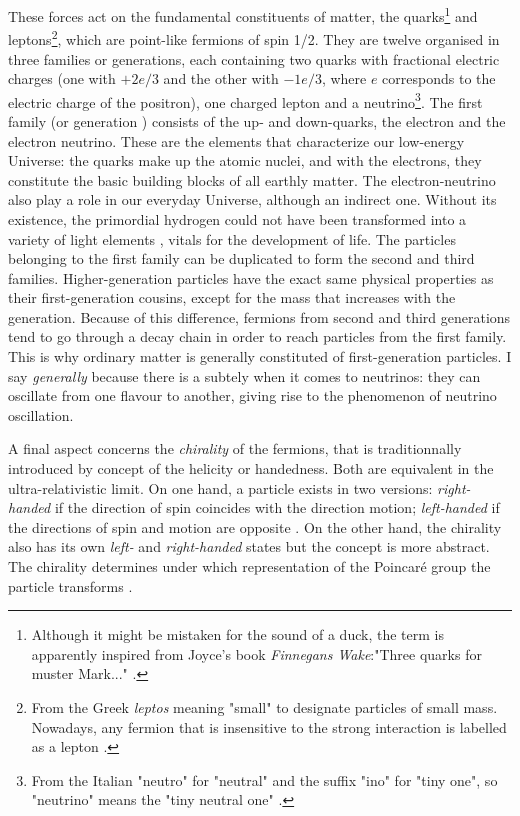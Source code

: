 These forces act on the fundamental constituents of matter, the quarks\footnote{Although it might be mistaken for the sound of a duck, the term is apparently inspired from Joyce's book \textit{Finnegans Wake}:"Three quarks for muster Mark..." \cite{s.glashowInteractionsJourneyMind1990}.} and leptons\footnote{From the Greek \textit{leptos} meaning "small" to designate particles of small mass. Nowadays, any fermion that is insensitive to the strong interaction is labelled as a lepton \cite{s.glashowInteractionsJourneyMind1990}.}, which are point-like fermions of spin 1/2. They are twelve organised in three families or generations, each containing two quarks with fractional electric charges (one with $+2 e /3$ and the other with $-1 e/3$, where $e$ corresponds to the electric charge of the positron), one charged lepton and a neutrino\footnote{From the Italian "neutro" for "neutral" and the suffix "ino" for "tiny one",  so "neutrino" means the "tiny neutral one" \cite{s.glashowInteractionsJourneyMind1990}.}. The first family (or generation ) consists of the up- and down-quarks, the electron and the electron neutrino. These are the elements that characterize our low-energy Universe: the quarks make up the atomic nuclei, and with the electrons, they constitute the basic building blocks of all earthly matter. The electron-neutrino also play a role in our everyday Universe, although an indirect one. Without its existence, the primordial hydrogen could not have been transformed into a variety of light elements \cite{kimElectronNeutrinoDegeneracyPrimordial1997}, vitals for the development of life. The particles belonging to the first family can be duplicated to form the second and third families. Higher-generation particles have the exact same physical properties as their first-generation cousins, except for the mass that increases with the generation. Because of this difference, fermions from second and third generations tend to go through a decay chain in order to reach particles from the first family. This is why ordinary matter is generally constituted of first-generation particles. I say \textit{generally} because there is a subtely when it comes to neutrinos: they can oscillate from one flavour to another, giving rise to the phenomenon of neutrino oscillation. 

A final aspect concerns the \textit{chirality} of the fermions, that is traditionnally introduced by concept of the helicity or handedness. Both are equivalent in the ultra-relativistic limit. On one hand, a particle exists in two versions: \textit{right-handed} if the direction of spin coincides with the direction motion; \textit{left-handed} if the directions of spin and motion are opposite \cite{thomsonModernParticlePhysics2013}. On the other hand, the chirality also has its own \textit{left-} and \textit{right-handed} states but the concept is more abstract. The chirality determines under which representation of the Poincaré group the particle transforms \cite{QuantumDiaries}.\\

